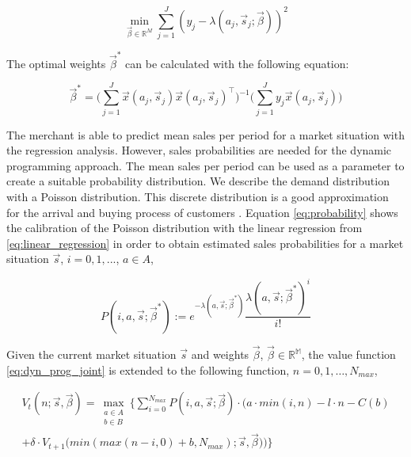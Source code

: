 \begin{equation}
 \min_{\vec{\beta} \in \mathbb{R}^M}{\sum_{j=1}^J
	{(y_j - \lambda(a_j, \vec{s}_j; \vec{\beta}))^2}
}
\label{eq:least_squares_objective}
\end{equation}

The optimal weights $\vec{\beta}^*$ can be calculated with the following equation:

\begin{equation}
\vec{\beta}^* = \bigg(\sum_{j=1}^J{\vec{x}(a_j,\vec{s}_j) \vec{x}(a_j,\vec{s}_j)^\intercal} \bigg)^{-1}
			  \bigg(\sum_{j=1}^J{y_j \vec{x}(a_j,\vec{s}_j)} \bigg)
\label{eq:least_squares_solution}
\end{equation}

The merchant is able to predict mean sales per period for a market situation with the regression analysis.
However, sales probabilities are needed for the dynamic programming approach.
The mean sales per period can be used as a parameter to create a suitable probability distribution.
We describe the demand distribution with a Poisson distribution.
This discrete distribution is a good approximation for the arrival and buying process of customers \cite{DBLP:journals/ior/Wolff82}.
Equation \cref{eq:probability} shows the calibration of the Poisson distribution with the linear regression from \cref{eq:linear_regression} in order to obtain estimated sales probabilities for a market situation $\vec{s}$, $i = 0,1,...$, $a \in A$,

\begin{equation}
\label{eq:probability}
P(i, a, \vec{s}; \vec{\beta}^*) :=
	e^{-\lambda(a, \vec{s}; \vec{\beta}^*)}
	\frac{\lambda(a, \vec{s}; \vec{\beta}^*)^{i}}{i!}
\end{equation}

Given the current market situation $\vec{s}$ and weights $\vec{\beta}$, $\vec{\beta} \in \mathbb{R^M}$, the value function \cref{eq:dyn_prog_joint} is extended to the following function, $n=0, 1, \ldots, N_{max}$,


\begin{equation}
\begin{split}
V_t(n; \vec{s}, \vec{\beta}) = \max_{\substack{a \in A \\ b \in B}} \Bigg\{
\sum_{i = 0}^{N_{max}}
P(i, a, \vec{s}; \vec{\beta}) \cdot \Big(
a \cdot min(i, n) %
- l \cdot n %
- C(b) %
\\
+ \delta \cdot V_{t+1}\big(min(max(n - i, 0) + b, N_{max}); \vec{s}, \vec{\beta}\big)
\Big)\Bigg\}
\end{split}
\end{equation}

